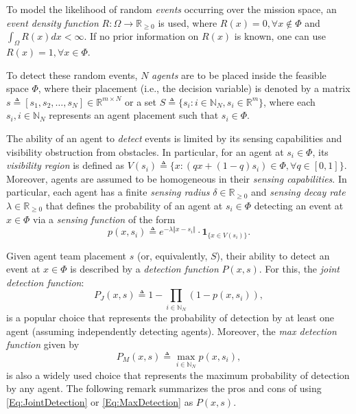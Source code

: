 \documentclass[letterpaper, 10 pt, conference]{ieeeconf}
\newcommand{\R}{\mathbb{R}}
\newcommand{\N}{\mathbb{N}}
\begin{document}
To model the likelihood of random \emph{events} occurring over the mission space, an \emph{event density function} $R:\Omega \rightarrow \R_{\geq0}$ is used, where $R(x) = 0, \forall x \not\in \Phi$ and $\int_\Omega R(x)dx <\infty$. If no prior information on $R(x)$ is known, one can use $R(x)=1, \forall x\in \Phi$. 

To detect these random events, $N$ \emph{agents} are to be placed inside the feasible space $\Phi$, where their placement (i.e., the decision variable) is denoted by a matrix $s \triangleq [s_1, s_2, \ldots, s_N]\in\R^{m\times N}$ or a set $S\triangleq \{s_i:i\in\N_N, s_i\in\R^m\}$, where each $s_i, i\in\N_N$ represents an agent placement such that $s_i \in \Phi$. 



The ability of an agent to \emph{detect} events is limited by its sensing capabilities and visibility obstruction from obstacles. In particular, for an agent at $s_i \in \Phi$, its \emph{visibility region} is defined as 
$
V(s_i) \triangleq \{x: (qx+(1-q)s_i)\in \Phi, \forall q \in [0,1] \}.
$ 
Moreover, agents are assumed to be homogeneous in their \emph{sensing capabilities}. In particular, each agent has a finite \emph{sensing radius} $\delta \in \R_{\geq 0}$ and \emph{sensing decay rate} $\lambda\in\R_{\geq 0}$ that defines the probability of an agent at $s_i\in \Phi$ detecting an event at $x\in \Phi$ via a \emph{sensing function} of the form 
\begin{equation}
\label{Eq:SensingFunction}
p(x,s_i)\triangleq e^{-\lambda \Vert x - s_i\Vert}\cdot\mathbf{1}_{\{x\in V(s_i)\}}.
\end{equation}




Given agent team placement $s$ (or, equivalently, $S$), their ability to detect an event at $x \in \Phi$ is described by a \emph{detection function} $P(x,s)$. For this, the \emph{joint detection function}: 
\begin{equation}\label{Eq:JointDetection}
P_J(x,s) \triangleq 1-\prod_{i\in\N_N}(1-p(x,s_i)),
\end{equation}
is a popular choice that represents the probability of detection by at least one agent (assuming independently detecting agents). Moreover, the \emph{max detection function} given by 
\begin{equation}\label{Eq:MaxDetection}
P_M(x,s) \triangleq \max_{i\in\N_N} p(x,s_i),
\end{equation}
is also a widely used choice that represents the maximum probability of detection by any agent. The following remark summarizes the pros and cons of using \eqref{Eq:JointDetection} or \eqref{Eq:MaxDetection} as $P(x,s)$.  
\end{document}

